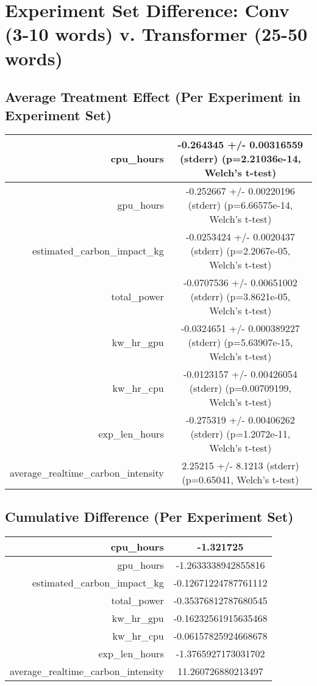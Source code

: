 \documentclass{article}%
\begin{document}
%
\normalsize%
\section{Experiment Set Difference: Conv (3{-}10 words) v. Transformer (25{-}50 words)}%
\label{sec:Experiment Set Difference Conv (3{-}10 words) v. Transformer (25{-}50 words)}%
\subsection{Average Treatment Effect (Per Experiment in Experiment Set)}%
\label{subsec:Average Treatment Effect (Per Experiment in Experiment Set)}%
\begin{tabular}{|r|c|}%
\hline%
cpu\_hours&{-}0.264345 +/{-} 0.00316559 (stderr) (p=2.21036e{-}14, Welch's t{-}test)\\%
\hline%
gpu\_hours&{-}0.252667 +/{-} 0.00220196 (stderr) (p=6.66575e{-}14, Welch's t{-}test)\\%
\hline%
estimated\_carbon\_impact\_kg&{-}0.0253424 +/{-} 0.0020437 (stderr) (p=2.2067e{-}05, Welch's t{-}test)\\%
\hline%
total\_power&{-}0.0707536 +/{-} 0.00651002 (stderr) (p=3.8621e{-}05, Welch's t{-}test)\\%
\hline%
kw\_hr\_gpu&{-}0.0324651 +/{-} 0.000389227 (stderr) (p=5.63907e{-}15, Welch's t{-}test)\\%
\hline%
kw\_hr\_cpu&{-}0.0123157 +/{-} 0.00426054 (stderr) (p=0.00709199, Welch's t{-}test)\\%
\hline%
exp\_len\_hours&{-}0.275319 +/{-} 0.00406262 (stderr) (p=1.2072e{-}11, Welch's t{-}test)\\%
\hline%
average\_realtime\_carbon\_intensity&2.25215 +/{-} 8.1213 (stderr) (p=0.65041, Welch's t{-}test)\\%
\hline%
\end{tabular}

%
\subsection{Cumulative Difference (Per Experiment Set)}%
\label{subsec:Cumulative Difference (Per Experiment Set)}%
\begin{tabular}{|r|c|}%
\hline%
cpu\_hours&{-}1.321725\\%
\hline%
gpu\_hours&{-}1.2633338942855816\\%
\hline%
estimated\_carbon\_impact\_kg&{-}0.12671224787761112\\%
\hline%
total\_power&{-}0.35376812787680545\\%
\hline%
kw\_hr\_gpu&{-}0.16232561915635468\\%
\hline%
kw\_hr\_cpu&{-}0.06157825924668678\\%
\hline%
exp\_len\_hours&{-}1.3765927173031702\\%
\hline%
average\_realtime\_carbon\_intensity&11.260726880213497\\%
\hline%
\end{tabular}

%
\end{document}
